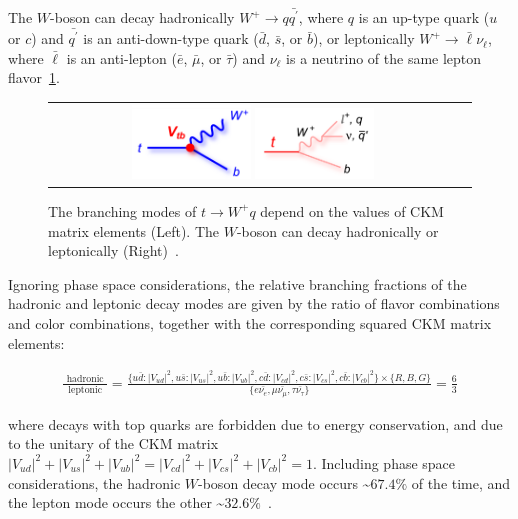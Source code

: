 The $W$-boson can decay hadronically $W^+ \rightarrow q \bar{q^\prime}$, where $q$ is an up-type quark ($u$ or $c$) and $\bar{q^\prime}$ is an anti-down-type quark ($\bar{d}$, $\bar{s}$, or $\bar{b}$), or leptonically $W^+ \rightarrow \bar{\ell} \nu_\ell$, where $\bar{\ell}$ is an anti-lepton ($\bar{e}$, $\bar{\mu}$, or $\bar{\tau}$) and $\nu_\ell$ is a neutrino of the same lepton flavor~\ref{t_decay}.
\begin{figure}[htb]
  \begin{center}
    \begin{tabular}{cc}
        \includegraphics[width=0.30\textwidth]{fig_TopQuark/feynman_t_decay_Vtb_blue.png}
        \includegraphics[width=0.30\textwidth]{fig_TopQuark/feynman_t_decay_ljetsqq_pink.png}
    \end{tabular}
    \caption{The branching modes of $t \rightarrow W^+ q$ depend on the values of CKM matrix elements (Left).
             The $W$-boson can decay hadronically or leptonically (Right)~\cite{d0_diagrams}.
    }
    \label{t_decay}
  \end{center}
\end{figure}
Ignoring phase space considerations, the relative branching fractions of the hadronic and leptonic decay modes are given by the ratio of flavor combinations and color combinations, together with the corresponding squared CKM matrix elements:
\begin{linenomath*}
{\small
\begin{align}
\frac{\text { hadronic }}{\text { leptonic }}=\frac{ \{ u\bar{d}:{\vert V_{ud} \vert}^2, u\bar{s}:{\vert V_{us} \vert}^2, u\bar{b}:{\vert V_{ub} \vert}^2, c\bar{d}:{\vert V_{cd} \vert}^2, c\bar{s}:{\vert V_{cs} \vert}^2, c\bar{b}:{\vert V_{cb} \vert}^2 \} \times \{ R, B, G\} }{ \{ e \bar{\nu_e }, \mu \bar{\nu_\mu}, \tau \bar{\nu_\tau} \}} = \frac{6}{3}
\end{align}
}%
\end{linenomath*}
where decays with top quarks are forbidden due to energy conservation, and due to the unitary of the CKM matrix ${\vert V_{ud} \vert}^2 + {\vert V_{us} \vert}^2 + {\vert V_{ub} \vert}^2 = {\vert V_{cd} \vert}^2 + {\vert V_{cs} \vert}^2 + {\vert V_{cb} \vert}^2 = 1$.
Including phase space considerations, the hadronic $W$-boson decay mode occurs \sim$67.4 \%$ of the time, and the lepton mode occurs the other \sim$32.6 \%$~\cite{bib:PDG}.

